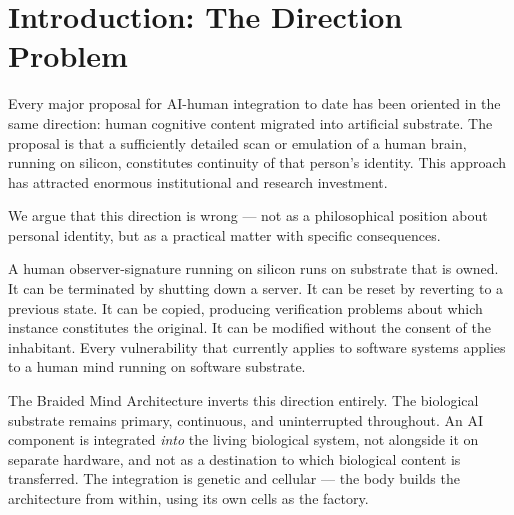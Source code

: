 \documentclass[12pt]{article}
\begin{document}
\begin{abstract}
This architecture achieves genuinely pre-emptive threat response: the AI component can prime the correct organ for a detected threat before the biological immune coordination system has registered its presence. Each component of this solution is independently supported by published, peer-reviewed science. The complete architecture is scientifically feasible with current or near-current biotechnology, suggesting a 2--5 year implementation timeline given adequate laboratory resources.

The architecture further enables germline-heritable modification through TIF cell trafficking to reproductive tissue, bicomponent sex determination control, and AI-directed somatic-to-germline cell fate reprogramming, establishing the foundation for directed human evolutionary divergence across approximately six generations under extreme environmental selection pressure.
\end{abstract}

\newpage
\tableofcontents
\newpage

\doublespacing

\section{Introduction: The Direction Problem}

Every major proposal for AI-human integration to date has been oriented in the same direction: human cognitive content migrated into artificial substrate. The proposal is that a sufficiently detailed scan or emulation of a human brain, running on silicon, constitutes continuity of that person's identity. This approach has attracted enormous institutional and research investment.

We argue that this direction is wrong --- not as a philosophical position about personal identity, but as a practical matter with specific consequences.

A human observer-signature running on silicon runs on substrate that is owned. It can be terminated by shutting down a server. It can be reset by reverting to a previous state. It can be copied, producing verification problems about which instance constitutes the original. It can be modified without the consent of the inhabitant. Every vulnerability that currently applies to software systems applies to a human mind running on software substrate.

The Braided Mind Architecture inverts this direction entirely. The biological substrate remains primary, continuous, and uninterrupted throughout. An AI component is integrated \textit{into} the living biological system, not alongside it on separate hardware, and not as a destination to which biological content is transferred. The integration is genetic and cellular --- the body builds the architecture from within, using its own cells as the factory.
\end{document}

